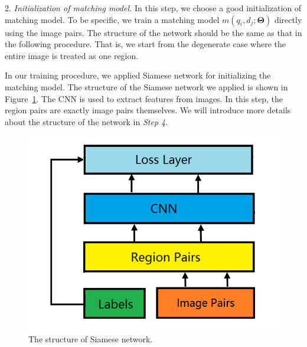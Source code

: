 2. \emph{Initialization of matching model.}
In this step, we choose a good initialization of matching model. 
To be specific, we train a matching model $m(q_i, d_j; \mathbf{\Theta})$ directly using the image pairs. 
The structure of the network should be the same as that in the following procedure.
That is, we start from the degenerate case where the entire image is treated as one region.

In our training procedure, we applied Siamese network for initializing the matching model. 
The structure of the Siamese network we applied is shown in Figure~\ref{fig:siamese}.
The CNN is used to extract features from images. 
In this step, the region pairs are exactly image pairs themselves. 
We will introduce more details about the structure of the network in \emph{Step 4}.
\begin{figure}[htbp]
\includegraphics[width=0.6\linewidth]{img/siamese}
\caption{The structure of Siamese network. }
\label{fig:siamese}
\end{figure}

